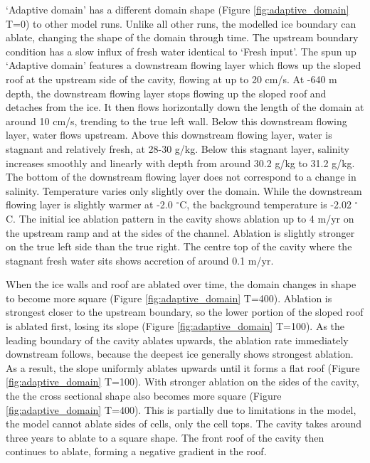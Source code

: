 `Adaptive domain' has a different domain shape (Figure \ref{fig:adaptive_domain} T=0) to other model runs. Unlike all other runs, the modelled ice boundary can ablate, changing the shape of the domain through time. The upstream boundary condition has a slow influx of fresh water identical to `Fresh input'.
The spun up `Adaptive domain' features a downstream flowing layer which flows up the sloped roof at the upstream side of the cavity, flowing at up to 20 cm/s. At -640 m depth, the downstream flowing layer stops flowing up the sloped roof and detaches from the ice. It then flows horizontally down the length of the domain at around 10 cm/s, trending to the true left wall. Below this downstream flowing layer, water flows upstream. Above this downstream flowing layer, water is stagnant and relatively fresh, at 28-30 g/kg. Below this stagnant layer, salinity increases smoothly and linearly with depth from around 30.2 g/kg to 31.2 g/kg. The bottom of the downstream flowing layer does not correspond to a change in salinity. Temperature varies only slightly over the domain. While the downstream flowing layer is slightly warmer at -2.0 $^\circ$C, the background temperature is -2.02 $^\circ$C. 
The initial ice ablation pattern in the cavity shows ablation up to 4 m/yr on the upstream ramp and at the sides of the channel. Ablation is slightly stronger on the true left side than the true right.  The centre top of the cavity where the stagnant fresh water sits shows accretion of around 0.1 m/yr.

When the ice walls and roof are ablated over time, the domain changes in shape to become more square (Figure \ref{fig:adaptive_domain} T=400). Ablation is strongest closer to the upstream boundary, so the lower portion of the sloped roof is ablated first, losing its slope (Figure \ref{fig:adaptive_domain} T=100). As the leading boundary of the cavity ablates upwards, the ablation rate immediately downstream follows, because the deepest ice generally shows strongest ablation. As a result, the slope uniformly ablates upwards until it forms a flat roof (Figure \ref{fig:adaptive_domain} T=100). With stronger ablation on the sides of the cavity, the the cross sectional shape also becomes more square (Figure \ref{fig:adaptive_domain} T=400). This is partially due to limitations in the model, the model cannot ablate sides of cells, only the cell tops. The cavity takes around three years to ablate to a square shape. The front roof of the cavity then continues to ablate, forming a negative gradient in the roof.

